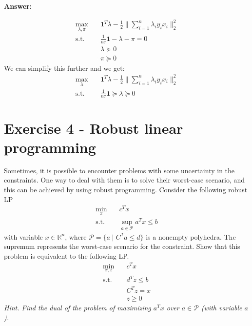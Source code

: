 \documentclass[11pt,a4paper]{article}
\newenvironment{solution}{
  \par\noindent\textbf{Answer:}\vspace{0.3em}
}{\vspace{1em}}
\begin{document}
\begin{solution}
\begin{enumerate}
$$\begin{aligned}
            \max_{\lambda, \pi} \quad & \boldsymbol{1}^T \lambda - \frac{1}{2} \| \sum_{i=1}^n \lambda_i y_i x_i \|_2^2\\
            \text{s.t.} \quad & \frac{1}{n\tau}\boldsymbol{1} - \lambda - \pi = 0\\
            & \lambda \succeq 0\\
            & \pi \succeq 0
        \end{aligned}$$
        We can simplify this further and we get: $$\begin{aligned}
            \max_\lambda \quad & \boldsymbol{1}^T \lambda - \frac{1}{2} \| \sum_{i=1}^n \lambda_i y_i x_i \|_2^2\\
            \text{s.t.} \quad & \frac{1}{n\tau}\boldsymbol{1} \succeq \lambda \succeq 0
        \end{aligned}$$
    \end{enumerate}
\end{solution}




\newpage
\section{Exercise 4 - Robust linear programming}
Sometimes, it is possible to encounter problems with some uncertainty in the constraints. One way to deal with them is to solve their worst-case scenario, and this can be achieved by using robust programming. Consider the following robust LP
\begin{equation}
    \begin{aligned}
        \min_{x} \quad & c^{T}x \\
        \text{s.t.} \quad & \sup_{a \in \mathcal{P}} a^{T}x \leq b
    \end{aligned}
\end{equation}
with variable $x \in \mathbb{R}^{n}$, where $\mathcal{P} = \{a \mid C^{T}a \leq d\}$ is a nonempty polyhedra. The supremum represents the worst-case scenario for the constraint.
Show that this problem is equivalent to the following LP.
\begin{equation}
    \begin{aligned}
        \min_{x,z} \quad & c^{T}x \\
        \text{s.t.} \quad & d^{T}z \leq b \\
        & C^{T}z = x \\
        & z \ge 0
    \end{aligned}
\end{equation}
\textit{Hint. Find the dual of the problem of maximizing $a^{T}x$ over $a \in \mathcal{P}$ (with variable $a$).}
\end{document}
